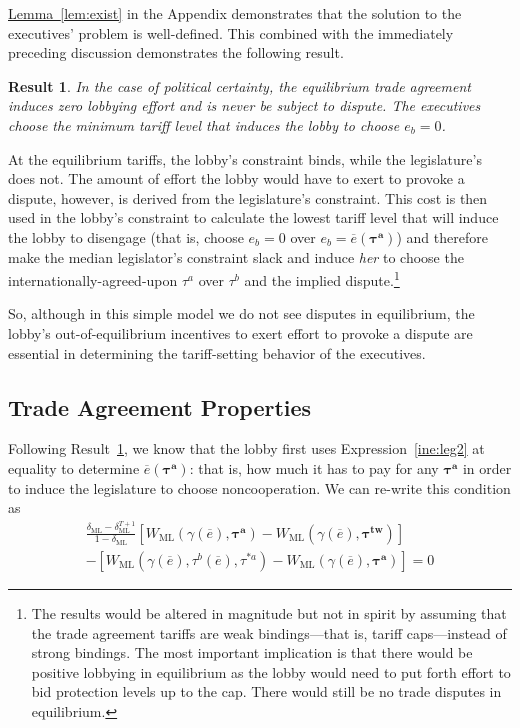\documentclass[authoryear, review]{elsarticle}
\newtheorem{result}{Result}
\newcommand{\ov}{\overline}
\newcommand{\bta}{\bm{\tau^a}}
\newcommand{\ga}{\gamma}
\newcommand{\btw}{\bm{\tau^{tw}}}
\newcommand{\de}{\delta}
\begin{document}
\hyperlink{Lem3}{Lemma~\ref{lem:exist}} in the Appendix demonstrates that the solution to the executives' problem is well-defined. This combined with the immediately preceding discussion demonstrates the following result.
\begin{result}
  In the case of political certainty, the equilibrium trade agreement induces zero lobbying effort and is never be subject to dispute. The executives choose the minimum tariff level that induces the lobby to choose $e_b=0$.
  \label{res:eqm}
\end{result}
At the equilibrium tariffs, the lobby's constraint binds, while the legislature's does not. The amount of effort the lobby would have to exert to provoke a dispute, however, is derived from the legislature's constraint. This cost is then used in the lobby's constraint to calculate the lowest tariff level that will induce the lobby to disengage (that is, choose $e_b =0$ over $e_b=\ov{e}(\bta)$) and therefore make the median legislator's constraint slack and induce \textit{her} to choose the internationally-agreed-upon $\tau^a$ over $\tau^b$ and the implied dispute.\footnote{The results would be altered in magnitude but not in spirit by assuming that the trade agreement tariffs are weak bindings---that is, tariff caps---instead of strong bindings. The most important implication is that there would be positive lobbying in equilibrium as the lobby would need to put forth effort to bid protection levels up to the cap. There would still be no trade disputes in equilibrium.}

So, although in this simple model we do not see disputes in equilibrium, the lobby's out-of-equilibrium incentives to exert effort to provoke a dispute are essential in determining the tariff-setting behavior of the executives.

\subsection{Trade Agreement Properties}
Following Result~\ref{res:eqm}, we know that the lobby first uses Expression~\ref{ine:leg2} at equality to determine $\ov{e}(\bta)$: that is, how much it has to pay for any $\bta$ in order to induce the legislature to choose noncooperation. We can re-write this condition as
\begin{multline}
  \frac{\de_\text{ML} - \de_\text{ML}^{T+1}}{1-\de_\text{ML}} \left[W_\text{ML}(\ga(\ov{e}),\bta) - W_\text{ML}(\ga(\ov{e}),\btw) \right] \\
	- \left[ W_\text{ML}(\ga(\ov{e}),\tau^b(\ov{e}),\tau^{*a}) - W_\text{ML}(\ga(\ov{e}),\bta) \right] = 0
  \label{eq:leg2}
\end{multline}
\end{document}
